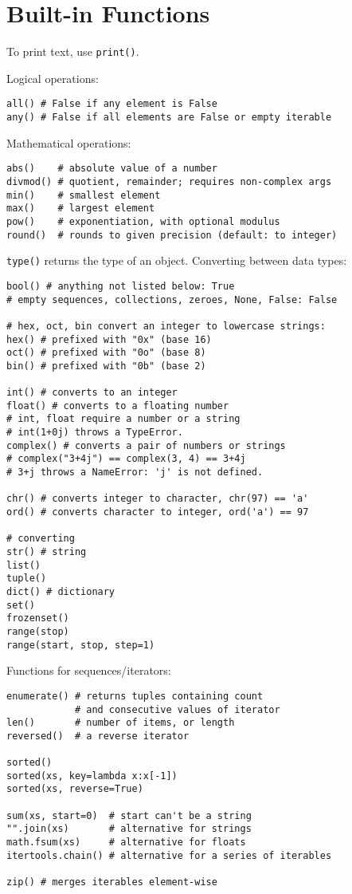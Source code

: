 \section{Built-in Functions}
To print text, use \texttt{print()}.

Logical operations:
\begin{verbatim}
all() # False if any element is False
any() # False if all elements are False or empty iterable
\end{verbatim}

Mathematical operations:
\begin{verbatim}
abs()    # absolute value of a number
divmod() # quotient, remainder; requires non-complex args
min()    # smallest element
max()    # largest element
pow()    # exponentiation, with optional modulus
round()  # rounds to given precision (default: to integer)
\end{verbatim}

\texttt{type()} returns the type of an object.
Converting between data types:
\begin{verbatim}
bool() # anything not listed below: True
# empty sequences, collections, zeroes, None, False: False

# hex, oct, bin convert an integer to lowercase strings:
hex() # prefixed with "0x" (base 16)
oct() # prefixed with "0o" (base 8)
bin() # prefixed with "0b" (base 2)

int() # converts to an integer
float() # converts to a floating number
# int, float require a number or a string
# int(1+0j) throws a TypeError.
complex() # converts a pair of numbers or strings
# complex("3+4j") == complex(3, 4) == 3+4j
# 3+j throws a NameError: 'j' is not defined.

chr() # converts integer to character, chr(97) == 'a'
ord() # converts character to integer, ord('a') == 97

# converting 
str() # string
list()
tuple()
dict() # dictionary
set()
frozenset()
range(stop)
range(start, stop, step=1)
\end{verbatim}

Functions for sequences/iterators:
\begin{verbatim}
enumerate() # returns tuples containing count
            # and consecutive values of iterator
len()       # number of items, or length
reversed()  # a reverse iterator

sorted()
sorted(xs, key=lambda x:x[-1])
sorted(xs, reverse=True)

sum(xs, start=0)  # start can't be a string
"".join(xs)       # alternative for strings
math.fsum(xs)     # alternative for floats
itertools.chain() # alternative for a series of iterables

zip() # merges iterables element-wise
\end{verbatim}

